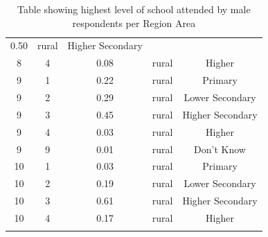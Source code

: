 \documentclass[stu, 12pt, floatsintext,longtable]{apa7}
\begin{document}
\begin{longtable}{ccccc}
    0.50
                                                       &
    rural                                              & Higher Secondary
    \\
    8                                                  & 4                    &
    0.08
                                                       &
    rural                                              & Higher
    \\
    9                                                  & 1                    &
    0.22
                                                       &
    rural                                              & Primary
    \\
    9                                                  & 2                    &
    0.29
                                                       &
    rural                                              & Lower Secondary
    \\
    9                                                  & 3                    &
    0.45
                                                       &
    rural                                              & Higher Secondary
    \\
    9                                                  & 4                    &
    0.03
                                                       &
    rural                                              & Higher
    \\
    9                                                  & 9                    &
    0.01
                                                       &
    rural                                              & Don't Know
    \\
    10                                                 & 1                    &
    0.03
                                                       &
    rural                                              & Primary
    \\
    10                                                 & 2                    &
    0.19
                                                       &
    rural                                              & Lower Secondary
    \\
    10                                                 & 3                    &
    0.61
                                                       &
    rural                                              & Higher Secondary
    \\
    10                                                 & 4                    &
    0.17
                                                       &
    rural                                              & Higher
    \\

    \bottomrule
    \caption{Table showing highest level of school attended by male respondents
        per Region Area}
    \label{tab:male}
\end{longtable}
\end{document}
